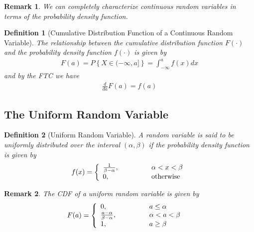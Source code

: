 \documentclass[11pt, oneside]{book}   	%
\newtheorem{definition}{Definition}[chapter]
\newtheorem{remark}{Remark}[chapter]
\begin{document}
\begin{spacing}{1.618}
\begin{remark}
	We can completely characterize continuous random variables in terms of the probability density function.
\end{remark}

\begin{definition}[Cumulative Distribution Function of a Continuous Random Variable]
	The relationship between the cumulative distribution function $F(\cdot)$ and the probability density function $f(\cdot)$ is given by 
	\begin{alignat}{4}
		F(a)=P\left\{X\in (-\infty, a]\right\} = \int_{-\infty}^af(x)dx
	\end{alignat}
	and by the FTC we have
	\begin{alignat}{4}
		\frac{d}{da}F(a)=f(a)
	\end{alignat}
\end{definition}

\subsection{The Uniform Random Variable}

\begin{definition}[Uniform Random Variable]
	A random variable is said to be uniformly distributed over the interval $(\alpha, \beta)$ if the probability density function is given by 
	\begin{alignat}{4}
		f(x)=\left\{\begin{array}{lll}
			\frac{1}{\beta - \alpha},&\hspace{1 cm}&\alpha < x < \beta \\
			0,&\hspace{1 cm}&\textrm{otherwise}
		\end{array}\right.
	\end{alignat}
\end{definition}

\begin{remark}
	The CDF of a uniform random variable is given by 
	\begin{alignat}{4}
		F(a)&=\left\{\begin{array}{lll}
			0,&\hspace{1 cm}&a\leq \alpha \\
			\frac{a - \alpha}{\beta - \alpha},&\hspace{1 cm}& \alpha<a<\beta \\
			1,&\hspace{1 cm}& a \geq \beta 
		\end{array}\right.
	\end{alignat}
\end{remark}


\end{spacing}
\end{document}
